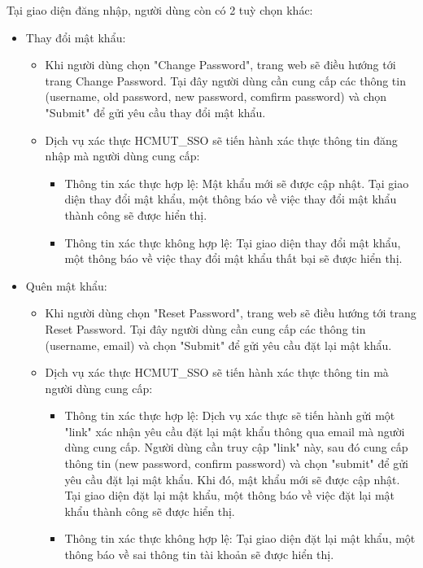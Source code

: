         Tại giao diện đăng nhập, người dùng còn có 2 tuỳ chọn khác:
        \begin{itemize}
            \item Thay đổi mật khẩu: 
            \begin{itemize}
                \item Khi người dùng chọn "Change Password", trang web sẽ điều hướng tới trang Change Password. Tại đây người dùng cần cung cấp các thông tin (username, old password, new password, comfirm password) và chọn "Submit" để gửi yêu cầu thay đổi mật khẩu.
                \item Dịch vụ xác thực HCMUT\_SSO sẽ tiến hành xác thực thông tin đăng nhập mà người dùng cung cấp:
                \begin{itemize}
                    \item Thông tin xác thực hợp lệ: Mật khẩu mới sẽ được cập nhật. Tại giao diện thay đổi mật khẩu, một thông báo về việc thay đổi mật khẩu thành công sẽ được hiển thị.
                    \item Thông tin xác thực không hợp lệ: Tại giao diện thay đổi mật khẩu, một thông báo về việc thay đổi mật khẩu thất bại sẽ được hiển thị.
                \end{itemize}
            \end{itemize}
            \item Quên mật khẩu:
            \begin{itemize}
                \item Khi người dùng chọn "Reset Password", trang web sẽ điều hướng tới trang Reset Password. Tại đây người dùng cần cung cấp các thông tin (username, email) và chọn "Submit" để gửi yêu cầu đặt lại mật khẩu.
                \item Dịch vụ xác thực HCMUT\_SSO sẽ tiến hành xác thực thông tin mà người dùng cung cấp:
                \begin{itemize}
                    \item Thông tin xác thực hợp lệ: Dịch vụ xác thực sẽ tiến hành gửi một "link" xác nhận yêu cầu đặt lại mật khẩu thông qua email mà người dùng cung cấp. Người dùng cần truy cập "link" này, sau đó cung cấp thông tin (new password, confirm password) và chọn "submit" để gửi yêu cầu đặt lại mật khẩu. Khi đó, mật khẩu mới sẽ được cập nhật. Tại giao diện đặt lại mật khẩu, một thông báo về việc đặt lại mật khẩu thành công sẽ được hiển thị.
                    \item Thông tin xác thực không hợp lệ: Tại giao diện đặt lại mật khẩu, một thông báo về sai thông tin tài khoản sẽ được hiển thị.
                \end{itemize}
            \end{itemize}
        \end{itemize}